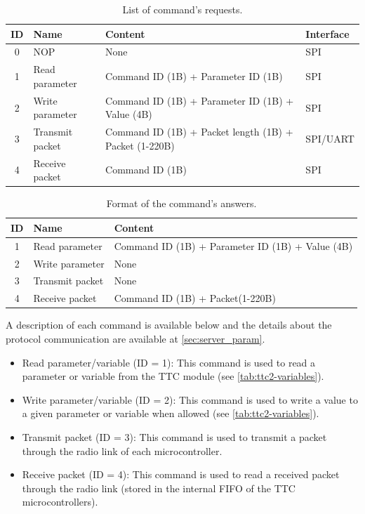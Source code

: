 \begin{table}[!ht]
    \centering
    \scriptsize
    \begin{tabular}{clll}
        \toprule[1.5pt]
        \textbf{ID} & \textbf{Name} & \textbf{Content} & \textbf{Interface}\\
        \midrule
        0   & NOP               & None                                           & SPI \\
        1   & Read parameter     & Command ID (1B) + Parameter ID (1B)   & SPI \\
        2   & Write parameter   & Command ID (1B) + Parameter ID (1B) + Value (4B) & SPI \\
        3   & Transmit packet   & Command ID (1B) + Packet length (1B)  + Packet (1-220B)         & SPI/UART \\
        4   & Receive packet    & Command ID (1B)      & SPI \\
        \bottomrule[1.5pt]
    \end{tabular}
    \caption{List of command's requests.}
    \label{tab:commands}
\end{table}

\begin{table}[!ht]
    \centering
    \scriptsize
    \begin{tabular}{cll}
        \toprule[1.5pt]
        \textbf{ID} & \textbf{Name} & \textbf{Content}\\
        \midrule
        1   & Read parameter    & Command ID (1B) + Parameter ID (1B) + Value (4B) \\
        2   & Write parameter   & None \\
        3   & Transmit packet   & None \\
        4   & Receive packet    & Command ID (1B) + Packet(1-220B) \\
        \bottomrule[1.5pt]
    \end{tabular}
    \caption{Format of the command's answers.}
    \label{tab:commands-ans}
\end{table}

A description of each command is available below and the details about the protocol communication are available at \autoref{sec:server_param}.

\begin{itemize}
    \item Read parameter/variable (ID = 1): This command is used to read a parameter or variable from the TTC module (see \autoref{tab:ttc2-variables}).
    \item Write parameter/variable (ID = 2): This command is used to write a value to a given parameter or variable when allowed (see \autoref{tab:ttc2-variables}).
    \item Transmit packet (ID = 3): This command is used to transmit a packet through the radio link of each microcontroller.
    \item Receive packet (ID = 4): This command is used to read a received packet through the radio link (stored in the internal FIFO of the TTC microcontrollers).
\end{itemize}


